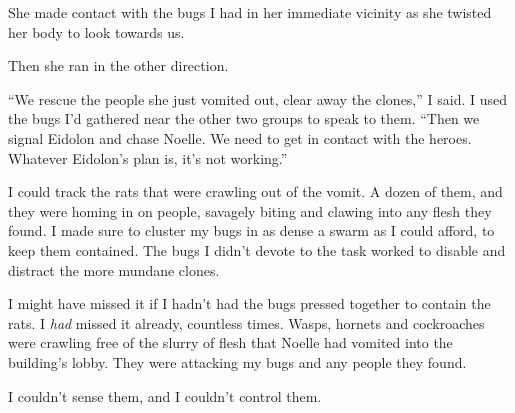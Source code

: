 She made contact with the bugs I had in her immediate vicinity as she twisted her body to look towards us.



Then she ran in the other direction.



``We rescue the people she just vomited out, clear away the clones,'' I said.  I used the bugs I'd gathered near the other two groups to speak to them.  ``Then we signal Eidolon and chase Noelle.  We need to get in contact with the heroes.  Whatever Eidolon's plan is, it's not working.''



I could track the rats that were crawling out of the vomit.  A dozen of them, and they were homing in on people, savagely biting and clawing into any flesh they found.  I made sure to cluster my bugs in as dense a swarm as I could afford, to keep them contained.  The bugs I didn't devote to the task worked to disable and distract the more mundane clones.



I might have missed it if I hadn't had the bugs pressed together to contain the rats.  I \emph{had} missed it already, countless times.  Wasps, hornets and cockroaches were crawling free of the slurry of flesh that Noelle had vomited into the building's lobby.  They were attacking my bugs and any people they found.



I couldn't sense them, and I couldn't control them.





